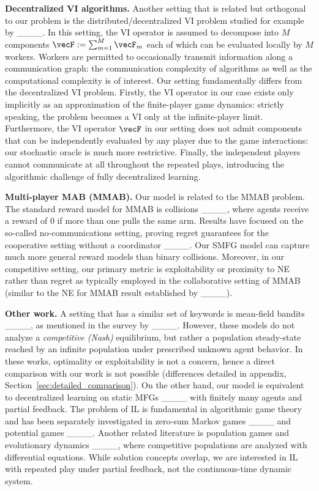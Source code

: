 \textbf{Decentralized VI algorithms.}
Another setting that is related but orthogonal to our problem is the distributed/decentralized VI problem studied for example by ____.
In this setting, the VI operator is assumed to decompose into $M$ components $\vecF := \sum_{m=1}^M \vecF_m$ each of which can be evaluated locally by $M$ workers.
Workers are permitted to occasionally transmit information along a communication graph: the communication complexity of algorithms as well as the computational complexity is of interest.
Our setting fundamentally differs from the decentralized VI problem. 
Firstly, the VI operator in our case exists only implicitly as an approximation of the finite-player game dynamics: strictly speaking, the problem becomes a VI only at the infinite-player limit.
Furthermore, the VI operator $\vecF$ in our setting does not admit components that can be independently evaluated by any player due to the game interactions: our stochastic oracle is much more restrictive.
Finally, the independent players cannot communicate at all throughout the repeated plays, introducing the algorithmic challenge of fully decentralized learning.

\textbf{Multi-player MAB (MMAB).}
Our model is related to the MMAB problem.
The standard reward model for MMAB is collisions ____, where agents receive a reward of 0 if more than one pulls the same arm.
Results have focused on the so-called no-communications setting, proving regret guarantees for the cooperative setting without a coordinator ____.
Our SMFG model can capture much more general reward models than binary collisions.
Moreover, in our competitive setting, our primary metric is exploitability or proximity to NE rather than regret as typically employed in the collaborative setting of MMAB (similar to the NE for MMAB result established by ____).

\textbf{Other work.}
A setting that has a similar set of keywords is mean-field bandits ____, as mentioned in the survey by ____.
However, these models do not analyze a \emph{competitive (Nash)} equilibrium, but rather a population steady-state reached by an infinite population under prescribed unknown agent behavior.
In these works, optimality or exploitability is not a concern, hence a direct comparison with our work is not possible (differences detailed in appendix, Section~\ref{sec:detailed_comparison}).
On the other hand, our model is equivalent to decentralized learning on static MFGs ____ with finitely many agents and partial feedback.
The problem of IL is fundamental in algorithmic game theory and has been separately investigated in zero-sum Markov games ____ and potential games ____.
Another related literature is population games and evolutionary dynamics ____, where competitive populations are analyzed with differential equations.
While solution concepts overlap, we are interested in IL with repeated play under partial feedback, not the continuous-time dynamic system.
